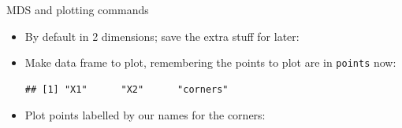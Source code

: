 \begin{frame}[fragile]{MDS and plotting commands}

  \begin{itemize}
  \item   By default in 2 dimensions; save the extra stuff for later:
\begin{knitrout}
\color{fgcolor}\begin{kframe}
\begin{alltt}
\hlkwb{=}
\end{alltt}
\end{kframe}
\end{knitrout}
\item Make data frame to plot, remembering the points to plot are in
  \texttt{points} now:
  
\begin{knitrout}
\color{fgcolor}\begin{kframe}
\begin{alltt}
\hlkwb{=}\hlopt{$}\hlstd{=}
\end{alltt}
\begin{verbatim}
## [1] "X1"      "X2"      "corners"
\end{verbatim}
\end{kframe}
\end{knitrout}
\item Plot points labelled by our names for the corners:
  
\begin{knitrout}
\color{fgcolor}\begin{kframe}
\begin{alltt}
\hlkwb{=}\hlstd{(}\hlopt{+}
  \hlstd{()}\hlopt{+}\hlstd{()}
\end{alltt}
\end{kframe}
\end{knitrout}
  \end{itemize}
  

\end{frame}


